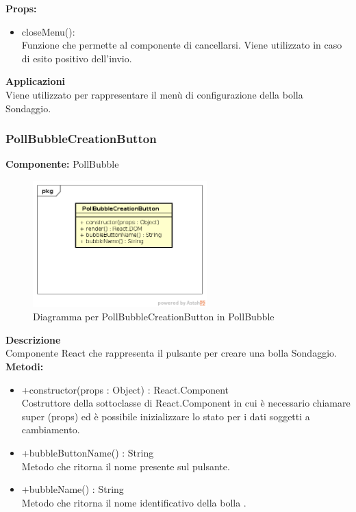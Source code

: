 \textbf{Props:} 
\begin{itemize}
\item closeMenu(): 
\\
Funzione che permette al componente di cancellarsi. Viene utilizzato in caso di esito positivo dell'invio.


\end{itemize} 


\textbf{Applicazioni}\\
Viene utilizzato per rappresentare il menù di configurazione della bolla Sondaggio. 


\clearpage

\subsubsection{PollBubbleCreationButton}
\textbf{Componente:}  PollBubble\\
   \FloatBarrier
   \begin{figure}[ht]
   \centering
   \includegraphics[width=0.6\textwidth]{img/single-PollBubbleCreationButton.png}
   \caption{{Diagramma per PollBubbleCreationButton in PollBubble}}
\end{figure}
\FloatBarrier
\textbf{Descrizione}\\
Componente React che rappresenta il pulsante per creare una bolla Sondaggio.
\\
\textbf{Metodi:} 
\begin{itemize}
\item +constructor(props : Object) : React.Component 
\\
Costruttore della sottoclasse di React.Component in cui è necessario chiamare super (props) ed è possibile inizializzare lo stato per i dati soggetti a cambiamento.

\item +bubbleButtonName() : String 
\\
Metodo che ritorna il nome presente sul pulsante.

\item +bubbleName() : String 
\\
Metodo che ritorna il nome identificativo della bolla .

\end{itemize}

